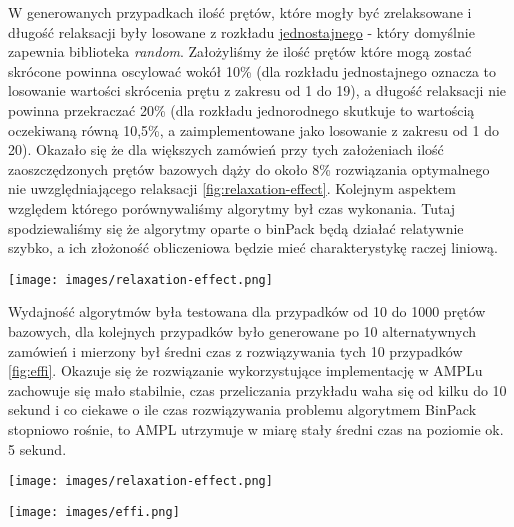 W generowanych przypadkach ilość prętów, które mogły być zrelaksowane i długość relaksacji były losowane z rozkładu \href{https://docs.python.org/3/library/random.html}{jednostajnego} - który domyślnie zapewnia biblioteka \textit{random}. Założyliśmy że ilość prętów które mogą zostać skrócone powinna oscylować wokół 10\% (dla rozkładu jednostajnego oznacza to losowanie wartości skrócenia prętu z zakresu od 1 do 19), a długość relaksacji nie powinna przekraczać 20\% (dla rozkładu jednorodnego skutkuje to wartością oczekiwaną równą 10,5\%, a zaimplementowane jako losowanie z zakresu od 1 do 20). Okazało się że dla większych zamówień przy tych założeniach ilość zaoszczędzonych prętów bazowych dąży do około 8\% rozwiązania optymalnego nie uwzględniającego relaksacji \ref{fig:relaxation-effect}. Kolejnym aspektem względem którego porównywaliśmy algorytmy był czas wykonania. Tutaj spodziewaliśmy się że algorytmy oparte o binPack będą działać relatywnie szybko, a ich złożoność obliczeniowa będzie mieć charakterystykę raczej liniową.

\begin{figure*}[!ht]
    \begin{center}
        \texttt{[image: images/relaxation-effect.png]}
    \end{center}
    \caption{Relaxation effect on optimal solution}
    \label{fig:relaxation-effect}
\end{figure*}

\FloatBarrier %

Wydajność algorytmów była testowana dla przypadków od 10 do 1000 prętów bazowych, dla kolejnych przypadków było generowane po 10 alternatywnych zamówień i mierzony był średni czas z rozwiązywania tych 10 przypadków \ref{fig:effi}. Okazuje się że rozwiązanie wykorzystujące implementację w AMPLu zachowuje się mało stabilnie, czas przeliczania przykładu waha się od kilku do 10 sekund i co ciekawe o ile czas rozwiązywania problemu algorytmem BinPack stopniowo rośnie, to AMPL utrzymuje w miarę stały średni czas na poziomie ok. 5 sekund.

\begin{figure*}[!ht]
    \begin{center}
        \texttt{[image: images/relaxation-effect.png]}
    \end{center}
    \caption{Relaxation effect on optimal solution}
    \label{fig:relaxation-effect}
\end{figure*}

\begin{figure*}
    \begin{center}
        \texttt{[image: images/effi.png]}
    \end{center}
    \caption{Time efficiency of BinPack and AMPL algorithms}
    \label{fig:effi}
\end{figure*}

\FloatBarrier %
